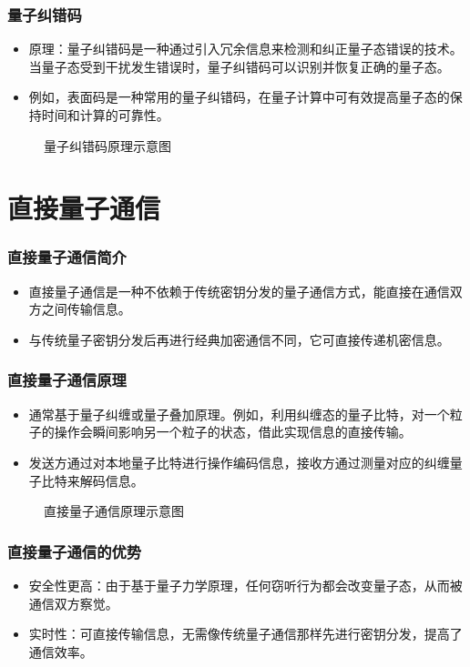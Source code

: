 \begin{frame}
    \frametitle{量子纠错码}
    \begin{itemize}
        \item 原理：量子纠错码是一种通过引入冗余信息来检测和纠正量子态错误的技术。当量子态受到干扰发生错误时，量子纠错码可以识别并恢复正确的量子态。
        \item 例如，表面码是一种常用的量子纠错码，在量子计算中可有效提高量子态的保持时间和计算的可靠性。
    \end{itemize}
    \begin{figure}
        \centering
        \caption{量子纠错码原理示意图}
    \end{figure}
\end{frame}

\section{直接量子通信}
\begin{frame}
    \frametitle{直接量子通信简介}
    \begin{itemize}
        \item 直接量子通信是一种不依赖于传统密钥分发的量子通信方式，能直接在通信双方之间传输信息。
        \item 与传统量子密钥分发后再进行经典加密通信不同，它可直接传递机密信息。
    \end{itemize}
\end{frame}

\begin{frame}
    \frametitle{直接量子通信原理}
    \begin{itemize}
        \item 通常基于量子纠缠或量子叠加原理。例如，利用纠缠态的量子比特，对一个粒子的操作会瞬间影响另一个粒子的状态，借此实现信息的直接传输。
        \item 发送方通过对本地量子比特进行操作编码信息，接收方通过测量对应的纠缠量子比特来解码信息。
    \end{itemize}
    \begin{figure}
        \centering
        \caption{直接量子通信原理示意图}
    \end{figure}
\end{frame}

\begin{frame}
    \frametitle{直接量子通信的优势}
    \begin{itemize}
        \item 安全性更高：由于基于量子力学原理，任何窃听行为都会改变量子态，从而被通信双方察觉。
        \item 实时性：可直接传输信息，无需像传统量子通信那样先进行密钥分发，提高了通信效率。
    \end{itemize}
\end{frame}

